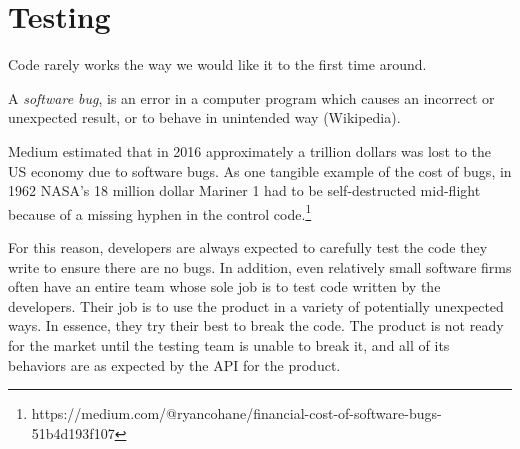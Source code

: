 \section{Testing}
Code rarely works the way we would like it to the first time around. 

\begin{definition}
A \emph{software bug}, is an error in a computer program which causes an incorrect or unexpected result, or to behave in unintended way (Wikipedia). 
\end{definition} 

Medium estimated that in 2016 approximately a trillion dollars was lost to the US economy due to software bugs. As one tangible example of the cost of bugs, in 1962 NASA's 18 million dollar Mariner 1 had to be self-destructed mid-flight because of a missing hyphen in the control code.\footnote{https://medium.com/@ryancohane/financial-cost-of-software-bugs-51b4d193f107}

For this reason, developers are always expected to carefully test the code they write to ensure there are no bugs. In addition, even relatively small software firms often have an entire team whose sole job is to test code written by the developers. Their job is to use the product in a variety of potentially unexpected ways. In essence, they try their best to break the code. The product is not ready for the market until the testing team is unable to break it, and all of its behaviors are as expected by the API for the product. 





